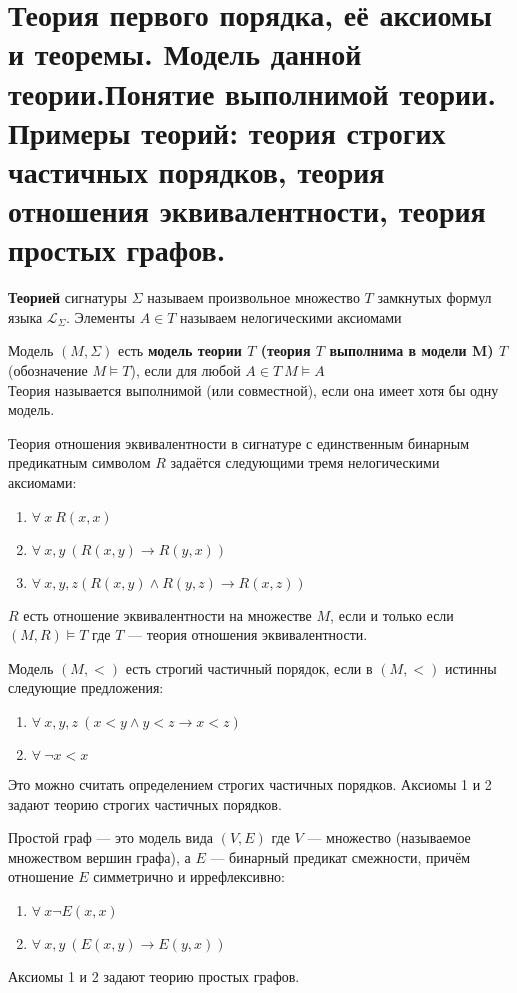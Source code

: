 \section{Теория первого порядка, её аксиомы и теоремы. Модель данной теории.Понятие выполнимой теории. Примеры
теорий: теория строгих частичных порядков, теория отношения эквивалентности, теория простых графов.}
\begin{definition}
	\textbf{Теорией} сигнатуры $\Sigma$ называем произвольное множество $T$ замкнутых формул языка
	$\mathcal{L}_{\Sigma}$. Элементы $A \in T$ называем нелогическими аксиомами 
\end{definition}
\begin{definition}
	Модель $(M,\Sigma)$ есть \textbf{модель теории  $T$ (теория $T$ выполнима в модели M) $T$} (обозначение
	$M\vDash T$), если для любой $A \in T \: M\vDash A$\\ \label{formula8}
    Теория называется выполнимой (или совместной), если она имеет хотя бы одну модель.
\end{definition}
\begin{example}
Теория отношения эквивалентности в сигнатуре с единственным бинарным предикатным символом $R$ задаётся следующими
	тремя нелогическими аксиомами:
	\begin{enumerate}
		\item $\forall \: x\: R(x,x)$
		\item $\forall \:x,y\: (R(x,y)\rightarrow R(y,x))$
		\item $\forall \:x,y,z (R(x,y)\wedge R(y,z)\rightarrow R(x,z))$
	\end{enumerate}
$R$ есть отношение эквивалентности на множестве $M$, если и
только если $(M,R)\vDash T$ где $T$ — теория отношения эквивалентности.
\end{example}
\begin{example}
    Модель $(M,<)$ есть строгий частичный порядок, если в $(M,<)$ истинны следующие предложения:
	\begin{enumerate}
		\item $\forall \:x,y,z\: (x<y\wedge y<z \rightarrow x<z)$
		\item $\forall \: \neg x<x$
	\end{enumerate}
    Это можно считать определением строгих частичных порядков. Аксиомы 1 и 2 задают теорию строгих частичных порядков.
\end{example}
\begin{example}
    Простой граф — это модель вида $(V,E)$ где $V$ — множество
	(называемое множеством вершин графа), а $E$ — бинарный предикат смежности, причём отношение $E$ симметрично и
	иррефлексивно:
	\begin{enumerate}
		\item $\forall \: x \neg E(x,x)$
		\item $\forall \: x,y\: (E(x,y)\rightarrow E(y,x))$
	\end{enumerate}
    Аксиомы 1 и 2 задают теорию простых графов.
\end{example}
